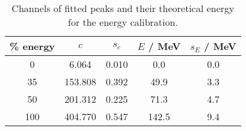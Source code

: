 \begin{table}[H]
\caption{Channels of fitted peaks and their theoretical energy for the energy calibration.}
\begin{center}
\begin{tabular}{|c|c|c|c|c|}
  \hline
  \% energy & $c$ & $s_c$ & $E$ / MeV & $s_E$ / MeV \\ \hline
  0 & 6.064 & 0.010 & 0.0 & 0.0 \\ \hline
  35 & 153.808 & 0.392 & 49.9 & 3.3 \\ \hline
  50 & 201.312 & 0.225 & 71.3 & 4.7 \\ \hline
  100 & 404.770 & 0.547 & 142.5 & 9.4 \\ \hline
\end{tabular}
\end{center}
\label{tab:ecal}
\end{table}
